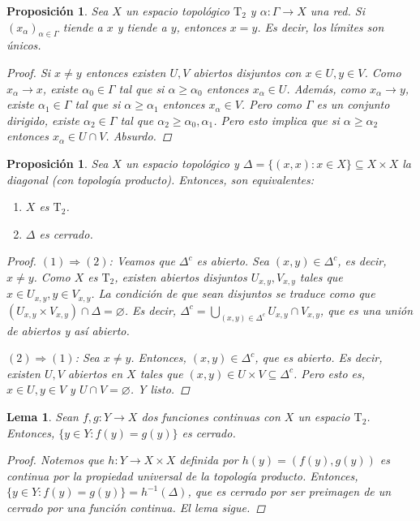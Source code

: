 \documentclass[12pt]{book}
\newtheorem{lem}[teo]{Lema}
\newtheorem{prop}[teo]{Proposición}
\theoremstyle{definition}
\let\emptyset\varnothing
\begin{document}
\begin{prop}
Sea $X$ un espacio topológico $\mathrm{T}_2$ y $\alpha:\Gamma\to X$ una red. Si $(x_\alpha)_{\alpha\in\Gamma}$ tiende a $x$ y tiende a $y$, entonces $x=y$. Es decir, los límites son únicos.
\begin{proof}
Si $x\neq y$ entonces existen $U,V$ abiertos disjuntos con $x\in U, y\in V$. Como $x_\alpha\to x$, existe $\alpha_0\in\Gamma$ tal que si $\alpha\geq \alpha_0$ entonces $x_\alpha\in U$. Además, como $x_\alpha\to y$, existe $\alpha_1\in\Gamma$ tal que si $\alpha\geq\alpha_1$ entonces $x_\alpha\in V$. Pero como $\Gamma$ es un conjunto dirigido, existe $\alpha_2\in\Gamma$ tal que $\alpha_2\geq \alpha_0,\alpha_1$. Pero esto implica que si $\alpha\geq \alpha_2$ entonces $x_\alpha \in U\cap V$. Absurdo.
\end{proof}
\end{prop}

\begin{prop}
Sea $X$ un espacio topológico y $\Delta = \{(x,x) : x\in X\}\subseteq X\times X$ la diagonal (con topología producto). Entonces, son equivalentes:
\begin{enumerate}
\item $X$ es $\mathrm{T}_2$.
\item $\Delta$ es cerrado.
\end{enumerate}
\begin{proof}
$(1)\Longrightarrow (2)$: Veamos que $\Delta^c$ es abierto. Sea $(x,y)\in\Delta^c$, es decir, $x\neq y$. Como $X$ es $\mathrm{T}_2$, existen abiertos disjuntos $U_{x,y}, V_{x,y}$ tales que $x\in U_{x,y}, y\in V_{x,y}$. La condición de que sean disjuntos se traduce como que $(U_{x,y}\times V_{x,y})\cap \Delta = \emptyset$. Es decir, $\Delta^c = \displaystyle\bigcup_{(x,y)\in\Delta^c} U_{x,y}\cap V_{x,y}$, que es una unión de abiertos y así abierto.

$(2)\Longrightarrow (1)$: Sea $x\neq y$. Entonces, $(x,y)\in \Delta^c$, que es abierto. Es decir, existen $U,V$ abiertos en $X$ tales que $(x,y)\in U\times V\subseteq \Delta^c$. Pero esto es, $x\in U, y\in V$ y $U\cap V=\emptyset$. Y listo.
\end{proof}
\end{prop}

\begin{lem}
Sean $f,g:Y\to X$ dos funciones continuas con $X$ un espacio $\mathrm{T}_2$. Entonces, $\{y\in Y : f(y)=g(y)\}$ es cerrado.
\begin{proof}
Notemos que $h:Y\to X\times X$ definida por $h(y) = (f(y),g(y))$ es continua por la propiedad universal de la topología producto. Entonces, $\{y\in Y : f(y)=g(y)\} = h^{-1}(\Delta)$, que es cerrado por ser preimagen de un cerrado por una función continua. El lema sigue.
\end{proof}
\end{lem}
\end{document}
